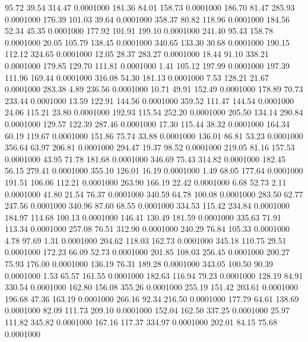   95.72   39.54  314.47   0.0001000
 181.36   84.01  158.73   0.0001000
 186.70   81.47  285.93   0.0001000
 176.39  101.03   39.64   0.0001000
 358.37   80.82  118.96   0.0001000
 184.56   52.34   45.35   0.0001000
 177.92  101.91  199.10   0.0001000
 241.40   95.43  158.78   0.0001000
  20.05  105.79  138.45   0.0001000
 340.65  133.30   30.68   0.0001000
 190.15  112.12  324.65   0.0001000
  12.05   28.37  283.27   0.0001000
  18.44   91.10  338.21   0.0001000
 179.85  129.70  111.81   0.0001000
   1.41  105.12  197.99   0.0001000
 197.39  111.96  169.44   0.0001000
 316.08   54.30  181.13   0.0001000
   7.53  128.21   21.67   0.0001000
 283.38    4.89  236.56   0.0001000
  10.71   49.91  152.49   0.0001000
 178.89   70.73  233.44   0.0001000
  13.59  122.91  144.56   0.0001000
 359.52  111.47  144.54   0.0001000
  24.06  115.21   23.80   0.0001000
 192.93  115.54  252.20   0.0001000
 205.50  134.14  290.84   0.0001000
 129.57  122.39  287.46   0.0001000
  17.30  115.44   38.32   0.0001000
 164.34   60.19  119.67   0.0001000
 151.86   75.74   33.88   0.0001000
 136.01   86.81   53.23   0.0001000
 356.64   63.97  206.81   0.0001000
 294.47   19.37   98.52   0.0001000
 219.05   81.16  157.53   0.0001000
  43.95   71.78  181.68   0.0001000
 346.69   75.43  314.82   0.0001000
 182.45   56.15  279.41   0.0001000
 355.10  126.01   16.19   0.0001000
   1.49   68.05  177.64   0.0001000
 191.51  106.06  112.21   0.0001000
 263.90  166.19   22.42   0.0001000
   6.68   52.73    2.11   0.0001000
  41.80   21.54   76.37   0.0001000
 340.59   64.78  100.08   0.0001000
 283.50   62.77  247.56   0.0001000
 340.96   87.60   68.55   0.0001000
 334.53  115.42  234.84   0.0001000
 184.97  114.68  100.13   0.0001000
 146.41  130.49  181.59   0.0001000
 335.63   71.91  113.34   0.0001000
 257.08   76.51  312.90   0.0001000
 240.29   76.84  105.33   0.0001000
   4.78   97.69    1.31   0.0001000
 204.62  118.03  162.73   0.0001000
 345.18  110.75   29.51   0.0001000
 172.23   66.09   52.73   0.0001000
 201.85  108.03  256.45   0.0001000
 200.27   75.93  176.00   0.0001000
 136.19   76.31  189.28   0.0001000
 343.05  100.50   90.39   0.0001000
   1.53   65.57  161.55   0.0001000
 182.63  116.94   79.23   0.0001000
 128.19   84.91  330.54   0.0001000
 162.80  156.08  355.26   0.0001000
 255.19  151.42  203.61   0.0001000
 196.68   47.36  163.19   0.0001000
 266.16   92.34  216.50   0.0001000
 177.79   64.61  138.69   0.0001000
  82.09  111.73  209.10   0.0001000
 152.04  162.50  337.25   0.0001000
  25.97  111.82  345.82   0.0001000
 167.16  117.37  334.97   0.0001000
 202.01   84.15   75.68   0.0001000
